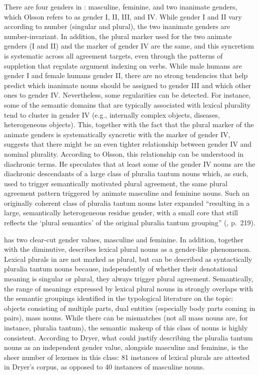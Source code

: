 \documentclass[output=collectionpaper]{langsci/langscibook}
\begin{document}
There are four genders in : masculine, feminine, and two inanimate genders, which Olsson refers to as gender I, II, III, and IV. While gender I and II vary according to number (singular and plural), the two inanimate genders are number-invariant. In addition, the plural marker used for the two animate genders (I and II) and the marker of gender IV are the same, and this syncretism is systematic across all agreement targets, even through the patterns of suppletion that regulate argument indexing on verbs. While male humans are gender I and female humans gender II, there are no strong tendencies that help predict which inanimate nouns should be assigned to gender III and which other ones to gender IV. Nevertheless, some regularities can be detected. For instance, some of the semantic domains that are typically associated with lexical plurality tend to cluster in gender IV (e.g., internally complex objects, diseases, heterogeneous objects). This, together with the fact that the plural marker of the animate genders is systematically syncretic with the marker of gender IV, suggests that there might be an even tighter relationship between gender IV and nominal plurality. According to Olsson, this relationship can be understood in diachronic terms. He speculates that at least some of the gender IV nouns are the diachronic descendants of a large class of pluralia tantum nouns which, as such, used to trigger semantically motivated plural agreement, the same plural agreement pattern triggered by animate masculine and feminine nouns. Such an originally coherent class of pluralia tantum nouns later expanded ``resulting in a large, semantically heterogeneous residue gender, with a small core that still reflects the `plural semantics' of the original pluralia tantum grouping'' (, p.~219).


\newpage 
{} has two clear-cut gender values, masculine and feminine. In addition, together with the diminutive,  describes lexical plural nouns as a gender-like phenomenon. Lexical plurals in  are not marked as plural, but can be described as syntactically pluralia tantum nouns because, independently of whether their denotational meaning is singular or plural, they always trigger plural agreement. Semantically, the range of meanings expressed by lexical plural nouns in  strongly overlaps with the semantic groupings identified in the typological literature on the topic: objects consisting of multiple parts, dual entities (especially body parts coming in pairs), mass nouns. While there can be mismatches (not all mass nouns are, for instance, pluralia tantum), the semantic makeup of this class of nouns is highly consistent. According to Dryer, what could justify describing the  pluralia tantum nouns as an independent gender value, alongside masculine and feminine, is the sheer number of lexemes in this class: 81 instances of lexical plurals are attested in Dryer's corpus, as opposed to 40 instances of masculine nouns.
\end{document}
